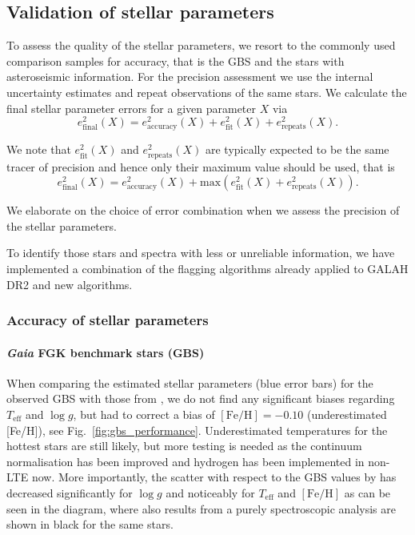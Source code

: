 \documentclass[fleqn,usenatbib,useAMS]{mnras}
\newcommand{\Gaia}{\textit{Gaia}\xspace}
\begin{document}
\subsection{Validation of stellar parameters} \label{sec:validation_sp}

To assess the quality of the stellar parameters, we resort to the commonly used comparison samples for accuracy, that is the GBS and the stars with asteroseismic information. For the precision assessment we use the internal uncertainty estimates and repeat observations of the same stars.  We calculate the final stellar parameter errors for a given parameter $X$ via 
\begin{equation}
e_\text{final}^2 (X) = e_\text{accuracy}^2(X) + e_\text{fit}^2(X) + e_\text{repeats}^2(X). \label{eq:final_error}
\end{equation}

We note that $e_\text{fit}^2(X)$ and $e_\text{repeats}^2(X)$ are typically expected to be the same tracer of precision and hence only their maximum value should be used, that is
\begin{equation}
e_\text{final}^2 (X) = e_\text{accuracy}^2(X) + \text{max} \left(e_\text{fit}^2(X) + e_\text{repeats}^2(X) \right).
\end{equation}

We elaborate on the choice of error combination when we assess the precision of the stellar parameters.

To identify those stars and spectra with less or unreliable information, we have implemented a combination of the flagging algorithms already applied to GALAH DR2 \citep[see][]{Buder2019} and new algorithms.

\subsubsection{Accuracy of stellar parameters}

\paragraph*{\Gaia FGK benchmark stars (GBS)}

When comparing the estimated stellar parameters (blue error bars) for the observed GBS with those from \citet{Jofre2018a}, we do not find any significant biases regarding $T_\text{eff}$ and $\log g$, but had to correct a bias of $\mathrm{[Fe/H]}  = -0.10$ (underestimated [Fe/H]), see Fig.~\ref{fig:gbs_performance}. Underestimated temperatures for the hottest stars are still likely, but more testing is needed as the continuum normalisation has been improved and hydrogen has been implemented in non-LTE now. More importantly, the scatter with respect to the GBS values by \citet{Jofre2018a} has decreased significantly for $\log g$ and noticeably for $T_\text{eff}$ and $\mathrm{[Fe/H]}$ as can be seen in the diagram, where also results from a purely spectroscopic analysis are shown in black for the same stars.
\end{document}
